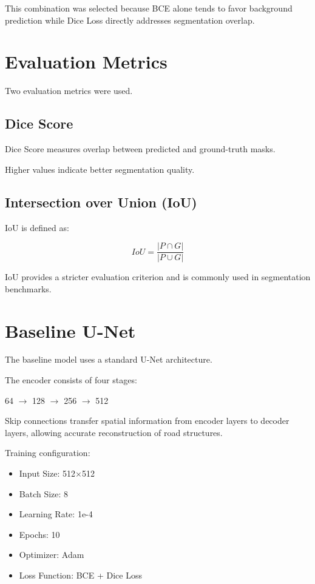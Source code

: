 \documentclass[12pt]{article}
\begin{document}
This combination was selected because BCE alone tends to favor background prediction while Dice Loss directly addresses segmentation overlap.

\section{Evaluation Metrics}

Two evaluation metrics were used.

\subsection{Dice Score}

Dice Score measures overlap between predicted and ground-truth masks.

Higher values indicate better segmentation quality.

\subsection{Intersection over Union (IoU)}

IoU is defined as:

\begin{equation}
IoU = \frac{|P \cap G|}{|P \cup G|}
\end{equation}

IoU provides a stricter evaluation criterion and is commonly used in segmentation benchmarks.

\section{Baseline U-Net}

The baseline model uses a standard U-Net architecture.

The encoder consists of four stages:

\begin{center}
64 $\rightarrow$ 128 $\rightarrow$ 256 $\rightarrow$ 512
\end{center}

Skip connections transfer spatial information from encoder layers to decoder layers, allowing accurate reconstruction of road structures.

Training configuration:

\begin{itemize}
\item Input Size: 512$\times$512
\item Batch Size: 8
\item Learning Rate: 1e-4
\item Epochs: 10
\item Optimizer: Adam
\item Loss Function: BCE + Dice Loss
\end{itemize}
\end{document}

